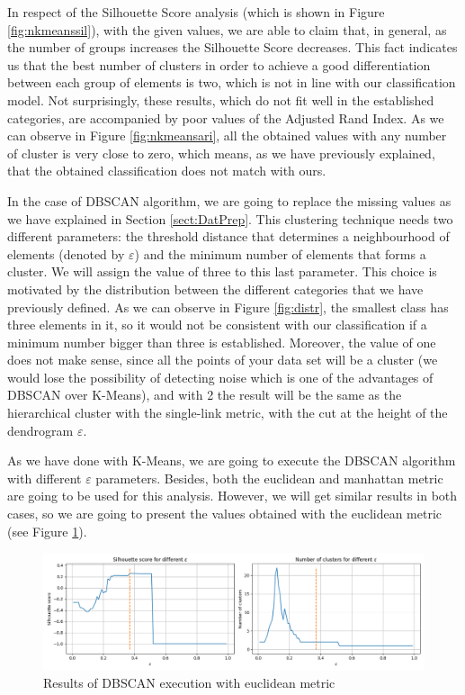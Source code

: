 In respect of the Silhouette Score analysis (which is shown in Figure \ref{fig:nkmeanssil}), with the given values, we are able to claim that, in general, as the number of groups increases the Silhouette Score decreases. This fact indicates us that the best number of clusters in order to achieve a good differentiation between each group of elements is two, which is not in line with our classification model. Not surprisingly, these results, which do not fit well in the established categories, are accompanied by poor values of the Adjusted Rand Index. As we can observe in Figure \ref{fig:nkmeansari}, all the obtained values with any number of cluster is very close to zero, which means, as we have previously explained, that the obtained classification does not match with ours.

In the case of DBSCAN algorithm, we are going to replace the missing values as we have explained in Section \ref{sect:DatPrep}. This clustering technique needs two different parameters: the threshold distance that determines a neighbourhood of elements (denoted by $\varepsilon$) and the minimum number of elements that forms a cluster. We will assign the value of three to this last parameter. This choice is motivated by the distribution between the different categories that we have previously defined. As we can observe in Figure \ref{fig:distr}, the smallest class has three elements in it, so it would not be consistent with our classification if a minimum number bigger than three is established. Moreover, the value of one does not make sense, since all the points of your data set will be a cluster (we would lose the possibility of detecting noise which is one of the advantages of DBSCAN over K-Means), and with 2 the result will be the same as the hierarchical cluster \citep{nielsen2016hierarchical} with the single-link metric, with the cut at the height of the dendrogram $\varepsilon$.

As we have done with K-Means, we are going to execute the DBSCAN algorithm with different $\varepsilon$ parameters. Besides, both the euclidean and manhattan metric are going to be used for this analysis. However, we will get similar results in both cases, so we are going to present the values obtained with the euclidean metric (see Figure \ref{fig:dbscaneu}).

\begin{figure}[t]
	\centering%
	\centerline{\includegraphics[width=\textwidth]{Imagenes/Bitmap/Clustering/dbscansil.png}}%
	\caption{Results of DBSCAN execution with euclidean metric}%
	\label{fig:dbscaneu}
\end{figure}

